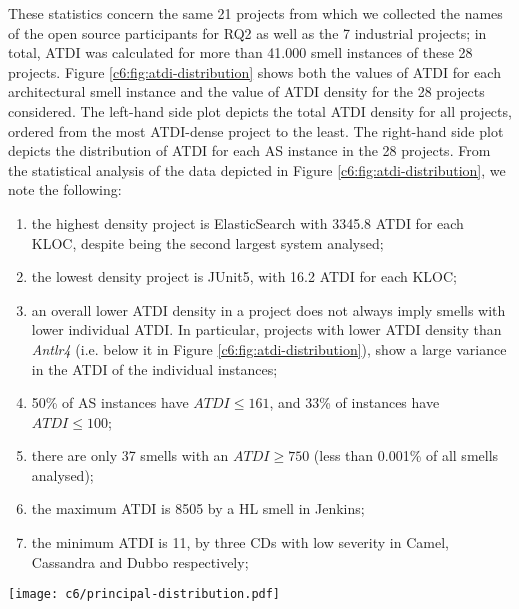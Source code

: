 These statistics concern the same 21 projects from which we collected the names of the open source participants for RQ2 as well as the 7 industrial projects; in total, ATDI was calculated for more than 41.000 smell instances of these 28 projects.
Figure \ref{c6:fig:atdi-distribution} shows both the values of ATDI for each architectural smell instance and the value of ATDI density for the 28 projects considered.
The left-hand side plot depicts the total ATDI density for all projects, ordered from the most ATDI-dense project to the least.
The right-hand side plot depicts the distribution of ATDI for each AS instance in the 28 projects.
From the statistical analysis of the data depicted in Figure \ref{c6:fig:atdi-distribution}, we note the following:
\begin{enumerate}
    \item the highest density project is ElasticSearch with 3345.8 ATDI for each KLOC, despite being the second largest system analysed;
    \item the lowest density project is JUnit5, with 16.2 ATDI for each KLOC;
    \item an overall lower ATDI density in a project does not always imply smells with lower individual ATDI. In particular, projects with lower ATDI density than \emph{Antlr4} (i.e. below it in Figure \ref{c6:fig:atdi-distribution}), show a large variance in the ATDI of the individual instances;
    \item 50\% of AS instances have $ATDI \le 161$, and 33\% of instances have $ATDI \le 100$;
    \item there are only 37 smells with an $ATDI \ge 750$ (less than 0.001\% of all smells analysed);
    \item the maximum ATDI is 8505 by a HL smell in Jenkins;
    \item the minimum ATDI is 11, by three CDs with low severity in Camel, Cassandra and Dubbo respectively;
\end{enumerate}

\begin{figure*}
    \centering
    \texttt{[image: c6/principal-distribution.pdf]}
    \caption{On the left, the total amount of principal (ATDI) per 1.000 lines of code (KLOC) for each project (calculated using Equation \ref{c6:eq:atdi-normalised}) compared with the number of KLOC. 
    On the right, boxplots depicting the distribution of the principal (ATDI) calculated for each AS instance (outliers not visualised). }\label{c6:fig:atdi-distribution}
\end{figure*}

